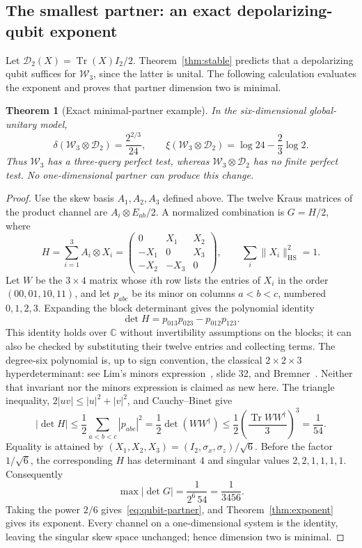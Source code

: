 \documentclass[11pt,a4paper]{article}
\newtheorem{theorem}{Theorem}[section]
\theoremstyle{remark}\newtheorem{remark}[theorem]{Remark}
\DeclareMathOperator{\Tr}{Tr}
\newcommand{\CC}{\mathbb C}
\newcommand{\HS}{\mathrm{HS}}
\begin{document}
\subsection{The smallest partner: an exact depolarizing-qubit exponent}
Let $\mathcal D_2(X)=\Tr(X)I_2/2$. Theorem~\ref{thm:stable} predicts that a depolarizing qubit suffices for $\mathcal W_3$, since the latter is unital. The following calculation evaluates the exponent and proves that partner dimension two is minimal.

\begin{theorem}[Exact minimal-partner example]\label{thm:qubit-partner}
In the six-dimensional global-unitary model,
\begin{equation}\boxed{\displaystyle
\delta(\mathcal W_3\otimes\mathcal D_2)=\frac{2^{2/3}}{24},\qquad
\xi(\mathcal W_3\otimes\mathcal D_2)=\log24-\frac23\log2.}
\label{eq:qubit-partner}
\end{equation}
Thus $\mathcal W_3$ has a three-query perfect test, whereas $\mathcal W_3\otimes\mathcal D_2$ has no finite perfect test. No one-dimensional partner can produce this change.
\end{theorem}
\begin{proof}
Use the skew basis $A_1,A_2,A_3$ defined above. The twelve Kraus matrices of the product channel are $A_i\otimes E_{ab}/2$. A normalized combination is $G=H/2$, where
\[
H=\sum_{i=1}^3 A_i\otimes X_i=
\begin{pmatrix}0&X_1&X_2\\-X_1&0&X_3\\-X_2&-X_3&0\end{pmatrix},
\qquad \sum_i\|X_i\|_\HS^2=1.
\]
Let $W$ be the $3\times4$ matrix whose $i$th row lists the entries of $X_i$ in the order $(00,01,10,11)$, and let $p_{abc}$ be its minor on columns $a<b<c$, numbered $0,1,2,3$. Expanding the block determinant gives the polynomial identity
\begin{equation}
\det H=p_{013}p_{023}-p_{012}p_{123}.
\label{eq:minor-identity}
\end{equation}
This identity holds over $\CC$ without invertibility assumptions on the blocks; it can also be checked by substituting their twelve entries and collecting terms. The degree-six polynomial is, up to sign convention, the classical $2\times2\times3$ hyperdeterminant: see Lim's minors expression~\cite{lim}, slide 32, and Bremner~\cite{bremner}. Neither that invariant nor the minors expression is claimed as new here. The triangle inequality, $2|uv|\le|u|^2+|v|^2$, and Cauchy--Binet give
\[
|\det H|\le\frac12\sum_{a<b<c}|p_{abc}|^2
=\frac12\det(WW^\dagger)
\le\frac12\left(\frac{\Tr WW^\dagger}{3}\right)^3
=\frac1{54}.
\]
Equality is attained by $(X_1,X_2,X_3)=(I_2,\sigma_x,\sigma_z)/\sqrt6$. Before the factor $1/\sqrt6$, the corresponding $H$ has determinant $4$ and singular values $2,2,1,1,1,1$. Consequently
\[
\max|\det G|=\frac1{2^6\,54}=\frac1{3456}.
\]
Taking the power $2/6$ gives~\eqref{eq:qubit-partner}, and Theorem~\ref{thm:exponent} gives its exponent. Every channel on a one-dimensional system is the identity, leaving the singular skew space unchanged; hence dimension two is minimal.
\end{proof}
\end{document}
